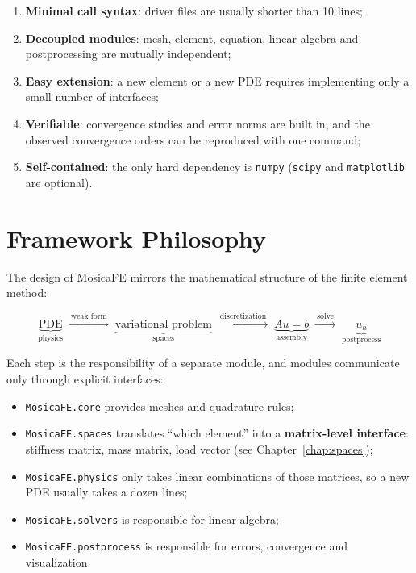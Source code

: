 \documentclass[11pt,oneside]{book}
\theoremstyle{definition}
\theoremstyle{plain}
\newcommand{\mosica}{\textsf{MosicaFE}}
\newcommand{\code}[1]{\texttt{#1}}
\newcommand{\module}[1]{\texttt{MosicaFE.#1}}
\begin{document}
\begin{enumerate}[label=(\arabic*),itemsep=0.25em]
  \item \textbf{Minimal call syntax}: driver files are usually shorter than 10 lines;
  \item \textbf{Decoupled modules}: mesh, element, equation, linear algebra and
        postprocessing are mutually independent;
  \item \textbf{Easy extension}: a new element or a new PDE requires implementing
        only a small number of interfaces;
  \item \textbf{Verifiable}: convergence studies and error norms are built in, and
        the observed convergence orders can be reproduced with one command;
  \item \textbf{Self-contained}: the only hard dependency is \code{numpy}
        (\code{scipy} and \code{matplotlib} are optional).
\end{enumerate}

\section{Framework Philosophy}

The design of \mosica{} mirrors the mathematical structure of the finite element
method:

\begin{equation}
\underbrace{\text{PDE}}_{\text{physics}}
\;\xrightarrow{\ \text{weak form}\ }\;
\underbrace{\text{variational problem}}_{\text{spaces}}
\;\xrightarrow{\ \text{discretization}\ }\;
\underbrace{Au=b}_{\text{assembly}}
\;\xrightarrow{\ \text{solve}\ }\;
\underbrace{u_h}_{\text{postprocess}}
\label{eq:philosophy}
\end{equation}

Each step is the responsibility of a separate module, and modules communicate only
through explicit interfaces:

\begin{itemize}[itemsep=0.2em]
  \item \module{core} provides meshes and quadrature rules;
  \item \module{spaces} translates ``which element'' into a \textbf{matrix-level
        interface}: stiffness matrix, mass matrix, load vector (see
        Chapter~\ref{chap:spaces});
  \item \module{physics} only takes linear combinations of those matrices, so a new
        PDE usually takes a dozen lines;
  \item \module{solvers} is responsible for linear algebra;
  \item \module{postprocess} is responsible for errors, convergence and
        visualization.
\end{itemize}
\end{document}
